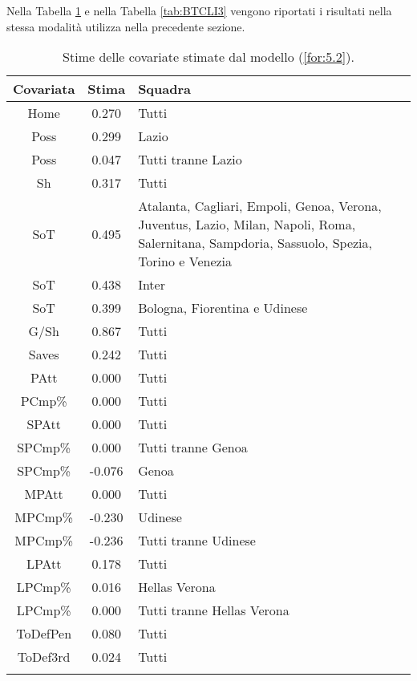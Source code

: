 Nella Tabella \ref{tab:BTCLI2} e nella Tabella \ref{tab:BTCLI3} vengono riportati i risultati nella stessa modalità utilizza nella precedente sezione.
\begin{table}[]%
	
	\renewcommand{\arraystretch}{1.7}
	\centering
	\begin{tabular}{ccp{10cm}}
		\hline	
		
		\textbf{Covariata} & \textbf{Stima} & \textbf{Squadra} \\	
		\hline
		Home & 0.270 & Tutti\\
		Poss & 0.299 & Lazio \\
		Poss & 0.047 & Tutti tranne Lazio\\
		Sh & 0.317 & Tutti \\
		SoT & 0.495 & Atalanta, Cagliari, Empoli, Genoa, Verona, Juventus, Lazio, Milan, Napoli, Roma, Salernitana, Sampdoria, Sassuolo, Spezia, Torino e Venezia\\
		SoT & 0.438 & Inter\\
		SoT & 0.399 & Bologna, Fiorentina e Udinese \\
		G/Sh & 0.867 & Tutti \\
		Saves & 0.242 & Tutti \\
		PAtt & 0.000 & Tutti \\
		PCmp\% & 0.000 & Tutti \\
		SPAtt & 0.000 & Tutti \\
		SPCmp\% & 0.000 & Tutti tranne Genoa \\ 
		SPCmp\% & -0.076 & Genoa \\	
		MPAtt & 0.000 & Tutti \\ 
		MPCmp\% & -0.230 & Udinese \\
		MPCmp\% & -0.236 & Tutti tranne Udinese \\		
		LPAtt & 0.178 & Tutti \\
		LPCmp\% & 0.016 & Hellas Verona \\
		LPCmp\% & 0.000 & Tutti tranne Hellas Verona \\
		ToDefPen & 0.080 & Tutti \\      
		ToDef3rd & 0.024 & Tutti \\
		
		
		\hline
		& &  \\
		
	\end{tabular} \hbox{}
	\caption{Stime delle covariate stimate dal modello (\ref{for:5.2}).} \label{tab:BTCLI2} 
	
\end{table}

